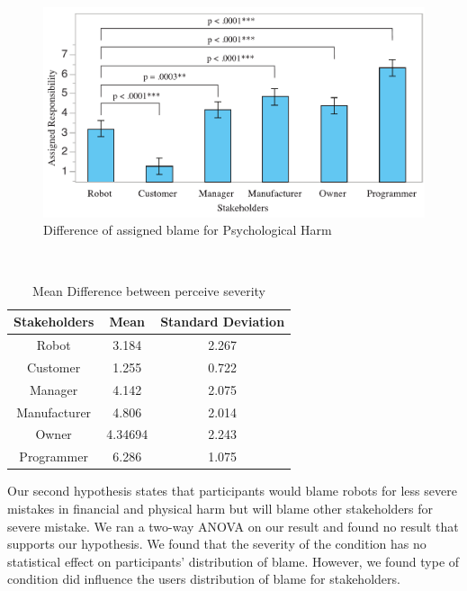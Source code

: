 \documentclass{sigchi}
\begin{document}
\begin{figure}[!h]
\centering
\includegraphics[width=1.0\columnwidth]{psychologicalGraph}
\caption{Difference of assigned blame for Psychological Harm}
\label{fig:figure5}
\end{figure}

\hspace{1 mm} \\
\begin{table}[h]
  \centering
  \begin{tabular}{ccc}
    Stakeholders & Mean & Standard Deviation\\
    \hline
    Robot & 3.184 & 2.267\\
    Customer & 1.255 & 0.722\\
    Manager & 4.142 & 2.075 \\
    Manufacturer & 4.806 & 2.014 \\
    Owner & 4.34694 & 2.243 \\
    Programmer & 6.286 & 1.075 \\
    \hline
  \end{tabular}
  \caption{Mean Difference between perceive severity}
  \label{tab:table2}
\end{table}

Our second hypothesis states that participants would blame robots for less severe mistakes in financial and physical harm but will blame other stakeholders for severe mistake. We ran a two-way ANOVA on our result and found no result that supports our hypothesis. We found that the severity of the condition has no statistical effect on participants' distribution of blame. However, we found type of condition did influence the users distribution of blame for stakeholders. 
\end{document}
